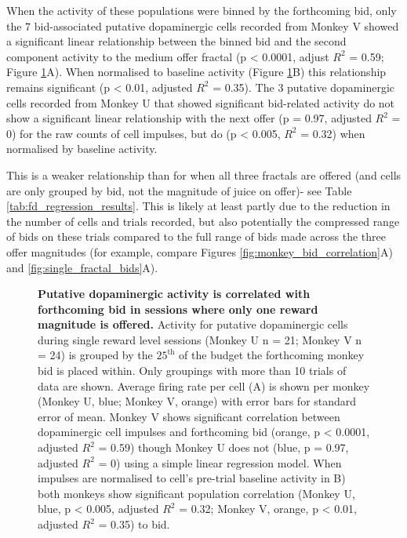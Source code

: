 When the activity of these populations were binned by the forthcoming bid, only the 7 bid-associated putative dopaminergic cells recorded from Monkey V showed a significant linear relationship between the binned bid and the second component activity to the medium offer fractal (p < 0.0001, adjust $R^2$ = 0.59; Figure \ref{fig:fractal_display_regression_one}A). When normalised to baseline activity (Figure \ref{fig:fractal_display_regression_one}B) this relationship remains significant (p < 0.01, adjusted $R^2$ = 0.35). The 3 putative dopaminergic cells recorded from Monkey U that showed significant bid-related activity do not show a significant linear relationship with the next offer (p = 0.97, adjusted $R^2$ = 0) for the raw counts of cell impulses, but do (p < 0.005, $R^2$ = 0.32) when normalised by baseline activity.

This is a weaker relationship than for when all three fractals are offered (and cells are only grouped by bid, not the magnitude of juice on offer)- see Table \ref{tab:fd_regression_results}. This is likely at least partly due to the reduction in the number of cells and trials recorded, but also potentially the compressed range of bids on these trials compared to the full range of bids made across the three offer magnitudes (for example, compare Figures \ref{fig:monkey_bid_correlation}A) and \ref{fig:single_fractal_bids}A).

\begin{figure}[p] 
\centering    

\caption[Putative dopaminergic activity is correlated with forthcoming bid in sessions where only one reward magnitude is offered.]{\textbf{Putative dopaminergic activity is correlated with forthcoming bid in sessions where only one reward magnitude is offered.} Activity for putative dopaminergic cells during single reward level sessions (Monkey U n = 21; Monkey V n = 24) is grouped by the $25^{\text{th}}$ of the budget the forthcoming monkey bid is placed within. Only groupings with more than 10 trials of data are shown. Average firing rate per cell (A) is shown per monkey (Monkey U, blue; Monkey V, orange) with error bars for standard error of mean. Monkey V shows significant correlation between dopaminergic cell impulses and forthcoming bid (orange, p < 0.0001, adjusted $R^2$ = 0.59) though Monkey U does not (blue, p = 0.97, adjusted $R^2$ = 0) using a simple linear regression model. When impulses are normalised to cell's pre-trial baseline activity in B) both monkeys show significant population correlation (Monkey U, blue, p < 0.005, adjusted $R^2$ = 0.32; Monkey V, orange, p < 0.01, adjusted $R^2$ = 0.35) to bid.}
\label{fig:fractal_display_regression_one}
\end{figure}

